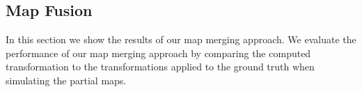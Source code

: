 \pagebreak
\pagebreak

\subsection{Map Fusion}
In this section we show the results of our map merging approach. We evaluate the performance of our map merging approach by comparing the computed transformation to the transformations applied to the ground truth when simulating the partial maps. 
